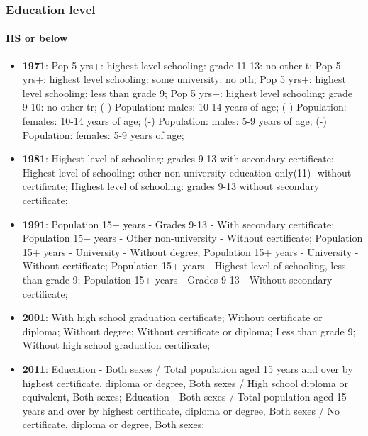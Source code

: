 \documentclass[a4paper]{article}
\begin{document}
\subsubsection{Education level}
\paragraph{HS or below}
\begin{itemize}
   \item{\textbf{1971}:  Pop 5 yrs+: highest level schooling: grade 11-13: no other t; Pop 5 yrs+: highest level schooling: some university: no oth; Pop 5 yrs+: highest level schooling: less than grade 9; Pop 5 yrs+: highest level schooling: grade 9-10: no other tr; (-)  Population: males: 10-14 years of age; (-)  Population: females: 10-14 years of age; (-)  Population: males: 5-9 years of age; (-)  Population: females: 5-9 years of age;}
   \item{\textbf{1981}:  Highest level of schooling: grades 9-13 with secondary certificate; Highest level of schooling: other non-university education only(11)- without certificate; Highest level of schooling: grades 9-13 without secondary certificate;}
   \item{\textbf{1991}:  Population 15+ years - Grades 9-13 - With secondary certificate; Population 15+ years - Other non-university - Without certificate; Population 15+ years - University - Without degree; Population 15+ years - University - Without certificate; Population 15+ years - Highest level of schooling, less than grade 9; Population 15+ years - Grades 9-13 - Without secondary certificate;}
   \item{\textbf{2001}:  With high school graduation certificate; Without certificate or diploma; Without degree; Without certificate or diploma; Less than grade 9; Without high school graduation certificate;}
   \item{\textbf{2011}:  Education - Both sexes / Total population aged 15 years and over by highest certificate, diploma or degree, Both sexes / High school diploma or equivalent, Both sexes; 
                         Education - Both sexes / Total population aged 15 years and over by highest certificate, diploma or degree, Both sexes / No certificate, diploma or degree, Both sexes;}
\end{itemize}
\end{document}
